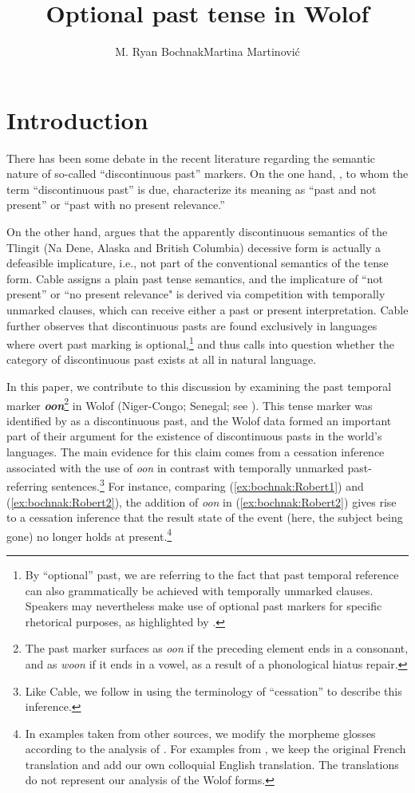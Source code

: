 \documentclass[output=paper,newtxmath,modfonts,nonflat,draftmode]{langsci/langscibook}
\title{Optional past tense in Wolof}
\author{M. Ryan Bochnak\affiliation{University of Konstanz}\lastand Martina Martinović\affiliation{University of Florida}}
\begin{document}
\maketitle
\section{Introduction}

There has been some debate in the recent literature regarding the semantic nature of so-called ``discontinuous past'' markers. On the one hand, \citet{Plungian2006}, to whom the term ``discontinuous past'' is due, characterize its meaning as ``past and not present'' or ``past with no present relevance.'' 

On the other hand, \cite{Cable2017a} 
argues that the apparently discontinuous semantics of the Tlingit (Na Dene, Alaska and British Columbia) decessive form \citep{Leer1991} is actually a defeasible implicature, i.e., not part of the conventional semantics of the tense form. Cable assigns a plain past tense semantics, and the implicature of ``not present'' or ``no present relevance" is derived via competition with temporally unmarked clauses, which can receive either a past or present interpretation. Cable further observes that discontinuous pasts are found exclusively in languages where overt past marking is optional,\footnote{By ``optional'' past, we are referring to the fact that past temporal reference can also grammatically be achieved with temporally unmarked clauses. Speakers may nevertheless make use of optional past markers for specific rhetorical purposes, as highlighted by \citet{Plungian2006}.} and thus calls into question whether the category of discontinuous past exists at all in natural language.


In this paper, we contribute to this discussion by examining the past temporal marker
\textit{\textbf{oon}}\footnote{The past marker surfaces as
  \textit{oon} if the preceding element ends in a consonant, and as
  \textit{woon} if it ends in a vowel, as a result of a phonological hiatus repair.} in Wolof (Niger-Congo; Senegal; see \citealt{church81systeme, robert91approche}). This tense marker was identified by \citet{Plungian2006} as a discontinuous past, and the Wolof data formed an important part of their argument for the existence of discontinuous pasts in the world's languages. The main evidence for this claim comes from a cessation inference associated with the use of \textit{oon} in contrast with temporally unmarked past-referring sentences.\footnote{Like Cable, we follow \citet{altshuler12moment} in using the terminology of ``cessation'' to describe this inference.} For instance, comparing (\ref{ex:bochnak:Robert1}) and (\ref{ex:bochnak:Robert2}), the addition of \textit{oon} in (\ref{ex:bochnak:Robert2}) gives rise to a cessation inference that the result state of the event (here, the subject being gone) no longer holds at present.\footnote{In examples taken from other sources, we modify the morpheme glosses according to the analysis of \citet{Martinovic2015b}. For examples from \citealt{robert91approche}, we keep the original French translation and add our own colloquial English translation. The translations do not represent our analysis of the Wolof forms.}
\end{document}
